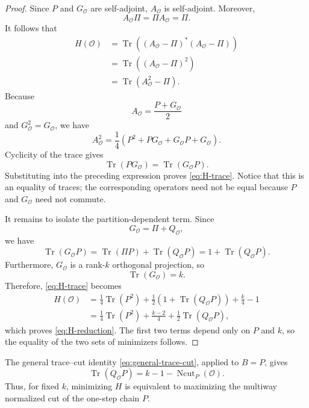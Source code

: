 \documentclass[11pt]{article}
\newcommand{\1}{\mathbf{1}}
\begin{document}
\begin{proof}
	Since $P$ and $G_{\mathcal O}$ are self-adjoint,
	$A_{\mathcal O}$ is self-adjoint.  Moreover,
	\[
	A_{\mathcal O}\Pi
	=\Pi A_{\mathcal O}
	=\Pi.
	\]
	It follows that
	\[
	\begin{aligned}
		H(\mathcal O)
		&=\operatorname{Tr}\left(
		(A_{\mathcal O}-\Pi)^*
		(A_{\mathcal O}-\Pi)
		\right) \\
		&=\operatorname{Tr}\left(
		(A_{\mathcal O}-\Pi)^2
		\right) \\
		&=\operatorname{Tr}(A_{\mathcal O}^2-\Pi).
	\end{aligned}
	\]
	Because
	\[
	A_{\mathcal O}
	=\frac{P+G_{\mathcal O}}{2}
	\]
	and $G_{\mathcal O}^2=G_{\mathcal O}$, we have
	\[
	A_{\mathcal O}^2
	=\frac14\left(
	P^2+PG_{\mathcal O}
	+G_{\mathcal O}P+G_{\mathcal O}
	\right).
	\]
	Cyclicity of the trace gives
	\[
	\operatorname{Tr}(PG_{\mathcal O})
	=\operatorname{Tr}(G_{\mathcal O}P).
	\]
	Substituting into the preceding expression proves
	\eqref{eq:H-trace}.  Notice that this is an equality of traces;
	the corresponding operators need not be equal because $P$ and
	$G_{\mathcal O}$ need not commute.
	
	It remains to isolate the partition-dependent term.  Since
	\[
	G_{\mathcal O}=\Pi+Q_{\mathcal O},
	\]
	we have
	\[
	\operatorname{Tr}(G_{\mathcal O}P)
	=\operatorname{Tr}(\Pi P)
	+\operatorname{Tr}(Q_{\mathcal O}P)
	=1+\operatorname{Tr}(Q_{\mathcal O}P).
	\]
	Furthermore, $G_{\mathcal O}$ is a rank-$k$ orthogonal projection, so
	\[
	\operatorname{Tr}(G_{\mathcal O})=k.
	\]
	Therefore, \eqref{eq:H-trace} becomes
	\[
	\begin{aligned}
		H(\mathcal O)
		&=\frac14\operatorname{Tr}(P^2)
		+\frac12\left(
		1+\operatorname{Tr}(Q_{\mathcal O}P)
		\right)
		+\frac{k}{4}-1 \\
		&=\frac14\operatorname{Tr}(P^2)
		+\frac{k-2}{4}
		+\frac12\operatorname{Tr}(Q_{\mathcal O}P),
	\end{aligned}
	\]
	which proves \eqref{eq:H-reduction}.  The first two terms depend only
	on $P$ and $k$, so the equality of the two sets of minimizers follows.
\end{proof}

The general trace--cut identity \eqref{eq:general-trace-cut}, applied
to $B=P$, gives
\begin{equation}
    \operatorname{Tr}(Q_{\mathcal O}P)
    =k-1-\operatorname{Ncut}_P(\mathcal O).
    \label{eq:QP-cut}
\end{equation}
Thus, for fixed $k$, minimizing $H$ is equivalent to maximizing the
multiway normalized cut of the one-step chain $P$.
\end{document}
